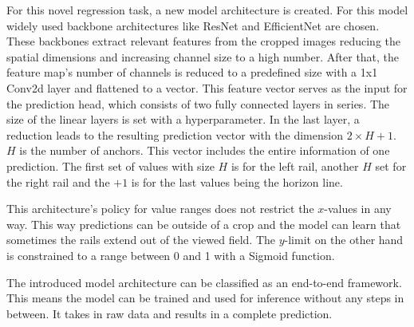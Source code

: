 For this novel regression task, a new model architecture is created.
For this model widely used backbone architectures like ResNet and EfficientNet are chosen.
These backbones extract relevant features from the cropped images reducing the spatial dimensions and increasing channel size to a high number.
After that, the feature map's number of channels is reduced to a predefined size with a 1x1 Conv2d layer \cite{pytorch_conv2d_docu} and flattened to a vector.
This feature vector serves as the input for the prediction head, which consists of two fully connected layers \cite{pytorch_linearLayer_docu} in series.
The size of the linear layers is set with a hyperparameter.
In the last layer, a reduction leads to the resulting prediction vector with the dimension $2 \times H + 1$.
$H$ is the number of anchors.
This vector includes the entire information of one prediction.
The first set of values with size $H$ is for the left rail, another $H$ set for the right rail and the $+ 1$ is for the last values being the horizon line.

This architecture's policy for value ranges does not restrict the $x$-values in any way.
This way predictions can be outside of a crop and the model can learn that sometimes the rails extend out of the viewed field.
The $y$-limit on the other hand is constrained to a range between 0 and 1 with a Sigmoid function.

The introduced model architecture can be classified as an end-to-end framework.
This means the model can be trained and used for inference without any steps in between.
It takes in raw data and results in a complete prediction.
